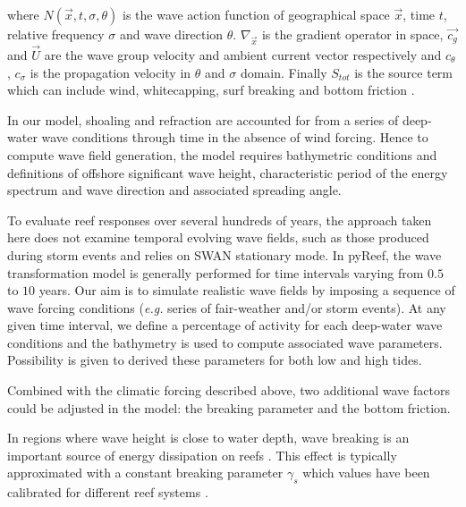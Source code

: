 \documentclass[default,jgrga]{agutex2015}
\begin{document}
\begin{article}
\noindent where $N(\vec{x},t,\sigma,\theta)$ is the wave action function of geographical space $\vec{x}$, time $t$, relative frequency $\sigma$ and wave direction $\theta$. $\nabla_{\vec{x}}$ is the gradient operator in space, $\vec{c_g}$ and $\vec{U}$ are the wave group velocity and ambient current vector respectively and $c_{\theta}$, $c_{\sigma}$ is the propagation velocity in $\theta$ and $\sigma$ domain. Finally $S_{tot}$ is the source term which can include wind, whitecapping, surf breaking and bottom friction \citep{Booij99}.

\noindent In our model, shoaling and refraction are accounted for from a series of deep-water wave conditions through time in the absence of wind forcing. Hence to compute wave field generation, the model requires bathymetric conditions and definitions of offshore significant wave height, characteristic period of the energy spectrum and wave direction and associated spreading angle.

\noindent To evaluate reef responses over several hundreds of years, the approach taken here does not examine temporal evolving wave fields, such as those produced during storm events and relies on SWAN stationary mode. In pyReef, the wave transformation model is generally performed for time intervals varying from $0.5$ to $10$ years. Our aim is to simulate realistic wave fields by imposing a sequence of wave forcing conditions (\textit{e.g.} series of fair-weather and/or storm events). At any given time interval, we define a percentage of activity for each deep-water wave conditions and the bathymetry is used to compute associated wave parameters. Possibility is given to derived these parameters for both low and high tides. 

Combined with the climatic forcing described above, two additional wave factors could be adjusted in the model: the breaking parameter and the bottom friction. 

\noindent In regions where wave height is close to water depth, wave breaking is an important source of energy dissipation on reefs \citep{Symonds95, Becker14}. This effect is typically approximated with a constant breaking parameter $\gamma_s$ \citep{Symonds95, Vetter10} which values have been calibrated for different reef systems \citep{Apotsos07, Vetter10, Monismith13, Franklin13, Rogers15}.


\end{article}
\end{document}
